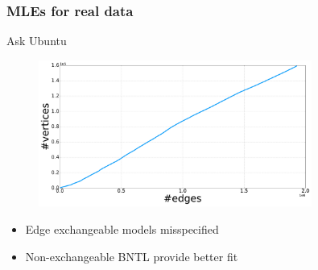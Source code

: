 \documentclass[final,hyperref={pdfpagelabels=false},noamsthm]{beamer}
\begin{document}
\begin{frame}
	\frametitle{MLEs for real data}
	Ask Ubuntu
	\begin{figure}[h]
		\includegraphics[width=0.8\textwidth]{fig/n_askubuntu_arrival.pdf}
	\end{figure}
	\begin{itemize}
		\item Edge exchangeable models misspecified
		\item Non-exchangeable BNTL provide better fit
	\end{itemize}
\end{frame}
	
\end{document}
